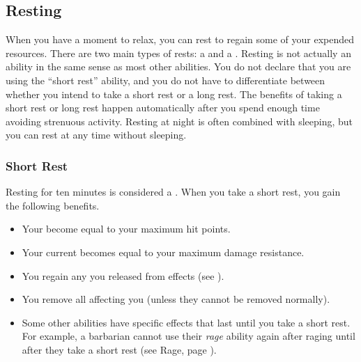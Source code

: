     \subsection{Resting}\label{Resting}
        When you have a moment to relax, you can rest to regain some of your expended resources.
        There are two main types of rests: a  and a .
        Resting is not actually an ability in the same sense as most other abilities.
        You do not declare that you are using the ``short rest'' ability, and you do not have to differentiate between whether you intend to take a short rest or a long rest.
        The benefits of taking a short rest or long rest happen automatically after you spend enough time avoiding strenuous activity.
        Resting at night is often combined with sleeping, but you can rest at any time without sleeping.

        \subsubsection{Short Rest}\label{Short Rest}
            Resting for ten minutes is considered a .
            When you take a short rest, you gain the following benefits.
            \begin{itemize}
                \item Your  become equal to your maximum hit points.
                \item Your current  becomes equal to your maximum damage resistance.
                \item You regain any  you released from  effects (see ).
                \item You remove all  affecting you (unless they cannot be removed normally).
                \item Some other abilities have specific effects that last until you take a short rest.
                    For example, a barbarian cannot use their \textit{rage} ability again after raging until after they take a short rest (see Rage, page ).
            \end{itemize}

